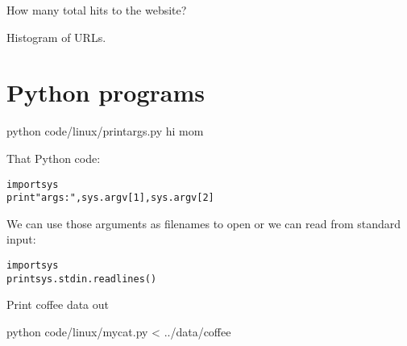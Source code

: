 \begin{fullwidth}
How many total hits to the website? 

Histogram of URLs.

\vspace{5mm}

\section{Python programs}

{\small
\bash[script,stdout,prefix=$]
python code/linux/printargs.py hi mom
\END
}

That Python code:
 
\begin{alltt}
import sys
print "args:", sys.argv[1], sys.argv[2]
\end{alltt}

We can use those arguments as filenames to open or we can read from standard input:
 
\begin{alltt}
import sys
print sys.stdin.readlines()  
\end{alltt}

Print coffee data out

{\small
\bash[script,stdout,prefix=$]
python code/linux/mycat.py < ../data/coffee
\END
}

\end{fullwidth}
